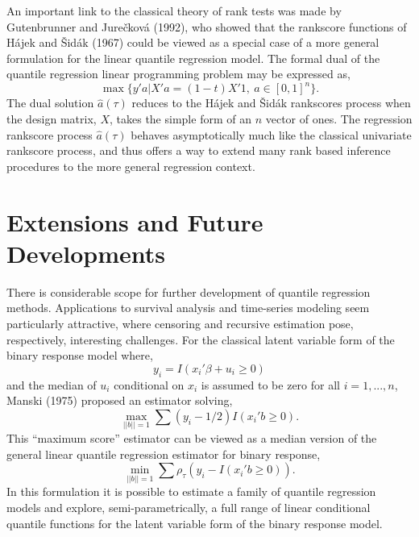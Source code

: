 \documentclass{amsart}
\newcommand{\Jureckova}{Jure\v{c}kov\'{a} }
\newcommand{\Hajek}{H\'{a}jek }
\newcommand{\Sidak}{\v{S}id\'{a}k }
\begin{document}
An important link to the classical theory of rank tests was made by 
Gutenbrunner and \Jureckova (1992), who showed that the rankscore functions of 
H\'{a}jek and \v{S}id\'{a}k (1967)  
could be viewed as a special case of a more general formulation for
the linear quantile regression model.  The formal dual of the quantile
regression linear programming problem may be expressed as,
\begin{equation*}
\max \{y'a | X'a = (1-t)X'1 , \: a \in [0, 1]^n \}.
\end{equation*}
The dual solution $\hat a (\tau)$ reduces to the \Hajek and \Sidak
rankscores process when the design matrix, $X$, takes the simple form 
of an $n$ vector of ones.
The regression rankscore process $\hat a (\tau)$ behaves asymptotically
much like the classical univariate rankscore process, and thus offers a 
way to extend many rank based inference procedures to the more
general regression context.

\section{Extensions and Future Developments}

There is considerable scope for further development of quantile regression
methods.  
Applications to survival analysis and time-series modeling seem
particularly attractive, where censoring and recursive estimation pose,
respectively, interesting challenges.  
For the classical latent variable form of the binary response model where,
\[
y_i = I(x_i ' \beta + u_i \geq 0 )
\]
and the median of $u_i$ conditional on $x_i$ is assumed to be zero for all
$i = 1 , ... , n$, Manski (1975) proposed an estimator solving,
\[
\max_{ || b || = 1} \sum (y_i - 1/2 ) I (x_i ' b \geq 0 ).
\]
This ``maximum score'' estimator can be viewed as a median version of the
general linear quantile regression estimator for binary response,
\[
\min_{ || b || = 1} \sum \rho_\tau (y_i - I (x_i ' b \geq 0 )).
\]
In this formulation it is possible to estimate a family of quantile regression
models and explore, semi-parametrically, a full range of linear conditional
quantile functions for the latent variable form of the binary response model.
\end{document}
